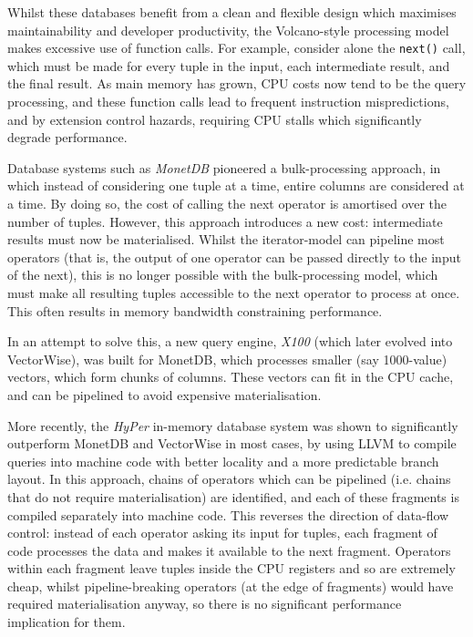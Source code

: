Whilst these databases benefit from a clean and flexible design which maximises maintainability and developer productivity, the Volcano-style processing model makes excessive use of function calls. For example, consider alone the \texttt{next()} call, which must be made for every tuple in the input, each intermediate result, and the final result. As main memory has grown, CPU costs now tend to be the query processing, and these function calls lead to frequent instruction mispredictions, and by extension control hazards, requiring CPU stalls which significantly degrade performance.

Database systems such as \emph{MonetDB} \cite{Boncz:2008:BMW:1409360.1409380} pioneered a bulk-processing approach, in which instead of considering one tuple at a time, entire columns are considered at a time. By doing so, the cost of calling the next operator is amortised over the number of tuples. However, this approach introduces a new cost: intermediate results must now be materialised. Whilst the iterator-model can pipeline most operators (that is, the output of one operator can be passed directly to the input of the next), this is no longer possible with the bulk-processing model, which must make all resulting tuples accessible to the next operator to process at once. This often results in memory bandwidth constraining performance.

In an attempt to solve this, a new query engine, \emph{X100} \cite{DBLP:conf/cidr/BonczZN05} (which later evolved into VectorWise), was built for MonetDB, which processes smaller (say 1000-value) vectors, which form chunks of columns. These vectors can fit in the CPU cache, and can be pipelined to avoid expensive materialisation.

More recently, the \emph{HyPer} in-memory database system \cite{Neumann:2011:ECE:2002938.2002940} was shown to significantly outperform MonetDB and VectorWise in most cases, by using LLVM to compile queries into machine code with better locality and a more predictable branch layout. In this approach, chains of operators which can be pipelined (i.e. chains that do not require materialisation) are identified, and each of these fragments is compiled separately into machine code. This reverses the direction of data-flow control: instead of each operator asking its input for tuples, each fragment of code processes the data and makes it available to the next fragment. Operators within each fragment leave tuples inside the CPU registers and so are extremely cheap, whilst pipeline-breaking operators (at the edge of fragments) would have required materialisation anyway, so there is no significant performance implication for them.

